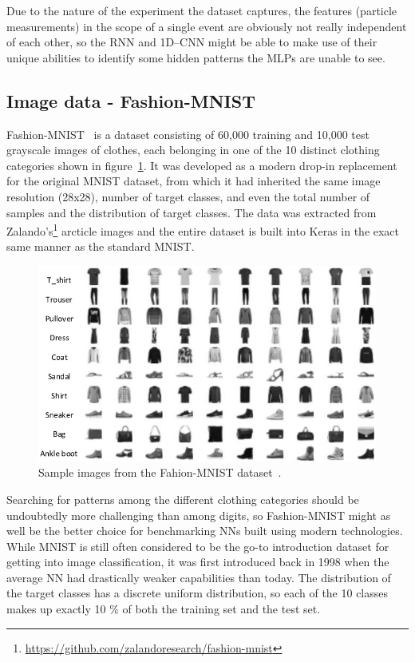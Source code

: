 Due to the nature of the experiment the dataset captures, the features (particle measurements) in the scope of a 
single event are obviously not
really independent of each other, so the RNN and 1D--CNN might be able to make use of their unique abilities to
identify some hidden patterns the MLPs are unable to see. 


\subsection{Image data - Fashion-MNIST}
\label{dataset-image}
Fashion-MNIST~\cite{DBLP:journals/corr/abs-1708-07747} is a dataset consisting of 60,000 training
and 10,000 test grayscale images of clothes,
each belonging in one of the 10 distinct clothing categories shown in figure~\ref{fig:fashion-mnist-samples}.
It was developed as a modern drop-in replacement
for the original MNIST dataset, from which it had inherited the same image resolution (28x28), number of
target classes, and even the total number of samples and the distribution of target classes.
The data was extracted from
Zalando's\footnote{\url{https://github.com/zalandoresearch/fashion-mnist}}
arcticle images and the entire dataset is built into Keras in the exact same manner as the standard MNIST.

\begin{figure}[!ht]
    \centering
    \includegraphics[width=\linewidth]{obrazky-figures/Fashion-MNIST_samples.png}
    \caption{Sample images from the Fahion-MNIST dataset~\cite[Figure~8]{DBLP:journals/corr/abs-2007-04039}.}
    \label{fig:fashion-mnist-samples}
\end{figure}

Searching for patterns among the different clothing categories should be undoubtedly more challenging
than among digits, so Fashion-MNIST might as well be the better choice for benchmarking NNs built using
modern technologies. While MNIST is still often considered to be the go-to introduction dataset
for getting into image classification, it was first introduced back in 1998 when the average NN had
drastically weaker capabilities than today.
The distribution of the target classes has a discrete uniform distribution, so each of the 10 classes
makes up exactly 10 \% of both the training set and the test set.



